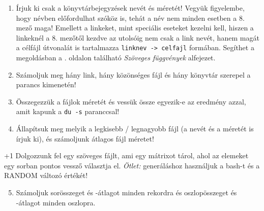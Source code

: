 \begin{enumerate}
\item Írjuk ki csak a könyvtárbejegyzések nevét és méretét! Vegyük figyelembe, hogy névben előfordulhat szóköz is, 
	tehát a  név nem minden esetben a 8. mező maga! Emellett a linkeket, mint speciális eseteket kezelni kell, 
	hiszen a linkeknél a 8. mezőtől kezdve az utolsóig nem csak a link nevét, hanem magát a célfájl útvonalát is tartalmazza	 
	\verb.linknev -> celfajl. formában. 
	Segíthet a megoldásban a \pageref{stringawk}. oldalon található \textit{Szöveges függvények} alfejezet.

\item Számoljuk meg hány link, hány közönséges fájl és hány könyvtár szerepel a parancs kimenetén!

\item Összegezzük a fájlok méretét és vessük össze egyezik-e az eredmény azzal, amit kapunk a \texttt{du -s} paranccsal!

\item Állapítsuk meg melyik a legkisebb / legnagyobb fájl (a nevét és a méretét is írjuk ki), és számoljunk átlagos fájl méretet!
\end{enumerate}


+1 Dolgozzunk fel egy szöveges fájlt, ami egy mátrixot tárol, ahol az elemeket egy sorban pontos vessző választja el. 
%
%
\textit{Ötlet:} generáláshoz használjuk a bash-t és a RANDOM változó értékét! 
%

\begin{enumerate}
\setcounter{enumi}{4}
\item Számoljuk sorösszeget és -átlagot minden rekordra és oszlopösszeget és -átlagot minden oszlopra. 
\end{enumerate}
